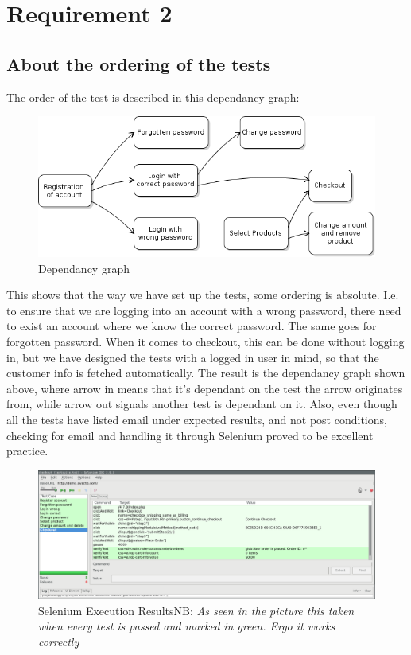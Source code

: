 \documentclass[UKenglish,12pt]{article}
\begin{document}
\section{Requirement 2}
\subsection{About the ordering of the tests}
The order of the test is described in this dependancy graph:

\begin{figure}[!htbp]
	\centering
	\includegraphics[scale=0.6,keepaspectratio]{Images/dependancygraph.png}
	\caption{Dependancy graph}
\end{figure}

This shows that the way we have set up the tests, some ordering is absolute. I.e. to ensure that we are logging into an account with a wrong password, there need to exist an account where we know the correct password. The same goes for forgotten password. When it comes to checkout, this can be done without logging in, but we have designed the tests with a logged in user in mind, so that the customer info is fetched automatically. The result is the dependancy graph shown above, where arrow in means that it's dependant on the test the arrow originates from, while arrow out signals another test is dependant on it. Also, even though all the tests have listed email under expected results, and not post conditions, checking for email and handling it through Selenium proved to be excellent practice.

\begin{figure}[H]
	\centering
	\includegraphics[scale=0.305,keepaspectratio]{Images/Selenium-screenshot2.png}
	\caption{Selenium Execution Results\newline NB: \textit{As seen in the picture this taken when every test is passed and marked in green. Ergo it works correctly}}
\end{figure}
\end{document}
